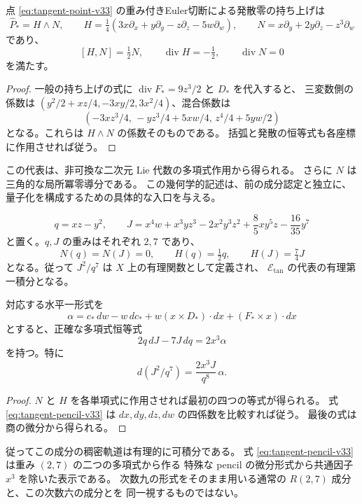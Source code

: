 \begin{proposition}
\label{prop:tangent-affine-lie-v33}
点 \eqref{eq:tangent-point-v33} の重み付きEuler切断による発散零の持ち上げは
\[
 \widehat P_*=H\wedge N,\qquad
 H=\tfrac14(3x\partial_x+y\partial_y-z\partial_z-5w\partial_w),\qquad
 N=x\partial_y+2y\partial_z-z^3\partial_w
\]
であり、
\[
 [H,N]=\tfrac12N,\qquad \operatorname{div}H=-\tfrac12,
 \qquad\operatorname{div}N=0
\]
を満たす。
\end{proposition}

\begin{proof}
一般の持ち上げの式に $\operatorname{div}F_*=9z^3/2$ と $D_*$ を代入すると、
三変数側の係数は
$(y^2/2+xz/4,-3xy/2,3x^2/4)$、混合係数は
\[
 (-3xz^3/4,\,-yz^3/4+5xw/4,\,z^4/4+5yw/2)
\]
となる。これらは $H\wedge N$ の係数そのものである。
括弧と発散の恒等式も各座標に作用させれば従う。
\end{proof}

この代表は、非可換な二次元 Lie 代数の多項式作用から得られる。
さらに $N$ は三角的な局所冪零導分である。
この幾何学的記述は、前の成分認定と独立に、量子化を構成するための具体的な入口を与える。

\begin{proposition}[明示的な有理第一積分]
\label{prop:tangent-first-integral-v33}
\[
 q=xz-y^2,\qquad
 J=x^4w+x^3yz^3-2x^2y^3z^2+\frac85xy^5z-\frac{16}{35}y^7
\]
と置く。$q,J$ の重みはそれぞれ $2,7$ であり、
\[
 N(q)=N(J)=0,\qquad H(q)=\tfrac12q,\qquad H(J)=\tfrac74J
\]
となる。従って $J^2/q^7$ は $X$ 上の有理関数として定義され、
$\mathcal E_{\mathrm{tan}}$ の代表の有理第一積分となる。

対応する水平一形式を
\[
 \alpha=c_*\,dw-w\,dc_*+w(x\times D_*)\cdot dx+(F_*\times x)\cdot dx
\]
とすると、正確な多項式恒等式
\begin{equation}
 2q\,dJ-7J\,dq=2x^3\alpha
 \label{eq:tangent-pencil-v33}
\end{equation}
を持つ。特に
\[
 d(J^2/q^7)=\frac{2x^3J}{q^8}\,\alpha.
\]
\end{proposition}

\begin{proof}
$N$ と $H$ を各単項式に作用させれば最初の四つの等式が得られる。
式 \eqref{eq:tangent-pencil-v33} は $dx,dy,dz,dw$ の四係数を比較すれば従う。
最後の式は商の微分から得られる。
\end{proof}

従ってこの成分の稠密軌道は有理的に可積分である。
式 \eqref{eq:tangent-pencil-v33} は重み $(2,7)$ の二つの多項式から作る
特殊な pencil の微分形式から共通因子 $x^3$ を除いた表示である。
次数九の形式をそのまま用いる通常の $R(2,7)$ 成分と、この次数六の成分とを
同一視するものではない。

